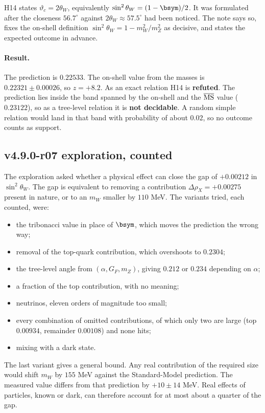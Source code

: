 H14 states \(\vartheta_c=2\theta_W\), equivalently \(\sin^2\theta_W=(1-\bsym)/2\).  It was formulated after the closeness
\(56.7^\circ\) against \(2\theta_W\approx57.5^\circ\) had been noticed.  The note says so, fixes the on-shell definition
\(\sin^2\theta_W=1-m_W^2/m_Z^2\) as decisive, and states the expected outcome in advance.

\paragraph{Result.}
The prediction is \(0.22533\).  The on-shell value from the masses is \(0.22321\pm0.00026\), so \(z=+8.2\).  As an exact
relation H14 is \textbf{refuted}.  The prediction lies inside the band spanned by the on-shell and the
\(\overline{\rm MS}\) value (\(0.23122\)), so as a tree-level relation it is \textbf{not decidable}.  A random simple
relation would land in that band with probability of about \(0.02\), so no outcome counts as support.

\subsection*{v4.9.0-r07 exploration, counted}
\label{subsec:v490-r07-exploration}

The exploration asked whether a physical effect can close the gap of \(+0.00212\) in \(\sin^2\theta_W\).  The gap is
equivalent to removing a contribution \(\Delta\rho_X=+0.00275\) present in nature, or to an \(m_W\) smaller by
\(110\) MeV.  The variants tried, each counted, were:
\begin{itemize}[leftmargin=2em]
\item the tribonacci value in place of \(\bsym\), which moves the prediction the wrong way;
\item removal of the top-quark contribution, which overshoots to \(0.2304\);
\item the tree-level angle from \((\alpha,G_F,m_Z)\), giving \(0.212\) or \(0.234\) depending on \(\alpha\);
\item a fraction of the top contribution, with no meaning;
\item neutrinos, eleven orders of magnitude too small;
\item every combination of omitted contributions, of which only two are large (top \(0.00934\), remainder \(0.00108\))
and none hits;
\item mixing with a dark state.
\end{itemize}
The last variant gives a general bound.  Any real contribution of the required size would shift \(m_W\) by \(155\) MeV
against the Standard-Model prediction.  The measured value differs from that prediction by \(+10\pm14\) MeV.  Real effects
of particles, known or dark, can therefore account for at most about a quarter of the gap.

